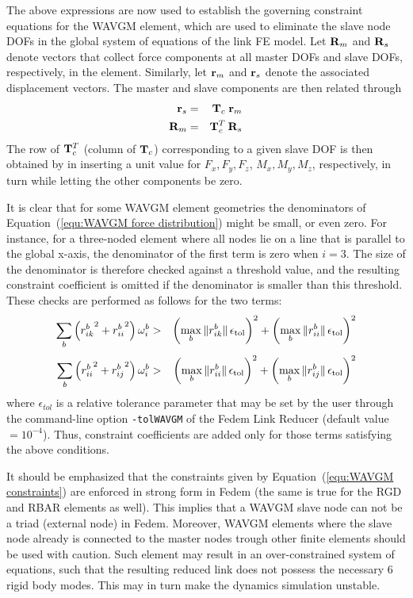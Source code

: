 The above expressions are now used to establish the governing constraint
equations for the WAVGM element, which are used to eliminate the slave node DOFs
in the global system of equations of the link FE model.
Let ${\bf R}_m$ and ${\bf R}_s$ denote vectors that collect force components at
all master DOFs and slave DOFs, respectively, in the element.
Similarly, let ${\bf r}_m$ and ${\bf r}_s$ denote the associated displacement
 vectors.
The master and slave components are then related through
%
\begin{eqnarray}
{\bf r}_s &=& {\bf T}_c   \;{\bf r}_m \label{equ:WAVGM constraints}\\
{\bf R}_m &=& {\bf T}_c^T \:{\bf R}_s
\end{eqnarray}
%
The row of ${\bf T}_c^T$ (column of ${\bf T}_c$) corresponding to a given
slave DOF is then obtained by in inserting a unit value for $F_x,F_y,F_z$,
$M_x,M_y,M_z$, respectively, in turn while letting the other components be zero.

It is clear that for some WAVGM element geometries the denominators of
Equation~(\ref{equ:WAVGM force distribution}) might be small, or even zero.
For instance, for a three-noded element where all nodes lie on a line that is
parallel to the global x-axis, the denominator of the first term is zero when
$i=3$.
The size of the denominator is therefore checked against a threshold value,
and the resulting constraint coefficient is omitted if the denominator is
smaller than this threshold. These checks are performed as follows for the
two terms:
%
\begin{eqnarray}
\sum_b\left( {r_{ik}^b}^2 + {r_{ii}^b}^2 \right)\omega_i^b &>&
\left(\max_b \|r_{ik}^b\|\,\epsilon_{\rm tol} \right)^2 +
\left(\max_b \|r_{ii}^b\|\,\epsilon_{\rm tol} \right)^2 \\[1mm]
\sum_b\left( {r_{ii}^b}^2 + {r_{ij}^b}^2 \right)\omega_i^b &>&
\left(\max_b \|r_{ii}^b\|\,\epsilon_{\rm tol} \right)^2 +
\left(\max_b \|r_{ij}^b\|\,\epsilon_{\rm tol} \right)^2
\end{eqnarray}
%
where $\epsilon_{tol}$ is a relative tolerance parameter that may be set by the
user through the command-line option {\tt -tolWAVGM} of the Fedem Link Reducer
(default value $=10^{-4}$).
Thus, constraint coefficients are added only for those terms satisfying the
above conditions.

It should be emphasized that the constraints given by
Equation~(\ref{equ:WAVGM constraints}) are enforced in strong form in Fedem
(the same is true for the RGD and RBAR elements as well).
This implies that a WAVGM slave node can not be a triad (external node) in Fedem.
Moreover, WAVGM elements where the slave node already is connected to the master
nodes trough other finite elements should be used with caution.
Such element may result in an over-constrained system of equations, such that
the resulting reduced link does not possess the necessary 6 rigid body modes.
This may in turn make the dynamics simulation unstable.
